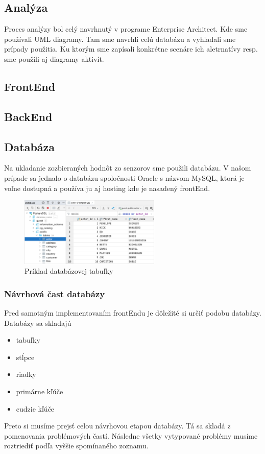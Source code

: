 \subsection{Analýza}
Proces analýzy bol celý navrhnutý v programe Enterprise Architect. Kde sme používali \acs{UML} diagramy. Tam sme navrhli celú databázu a vyhľadali sme prípady použitia. Ku ktorým sme zapísali konkrétne scenáre ich aletrnatívy resp. sme použili aj diagramy aktivít. 
\subsection{FrontEnd}

\subsection{BackEnd}

\subsection{Databáza}
Na ukladanie zozbieraných hodnôt zo senzorov sme použili databázu. V našom prípade sa jednalo o databázu spoločnosti Oracle s názvom MySQL, ktorá je voľne dostupná a používa ju aj hosting kde je nasadený frontEnd.
\begin{figure}[h!]
    \centering
    \includegraphics[width=0.6\textwidth]{obrazky/Table.png}
    \caption{Príklad databázovej tabuľky}
\end{figure}

\subsubsection{Návrhová čast databázy}
Pred samotným implementovaním frontEndu je dôležité si určiť podobu databázy. Databázy sa skladajú
\begin{itemize}
    \item tabuľky   
     \item stĺpce
     \item riadky
     \item primárne kľúče
     \item cudzie kľúče
\end{itemize} 
Preto si musíme prejsť celou návrhovou etapou databázy. Tá sa skladá z pomenovania problémových častí. Následne všetky vytypované problémy musíme roztriediť podľa vyššie spomínaného zoznamu.